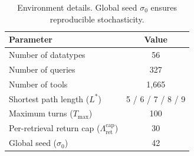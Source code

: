 \begin{table}[t]
\begin{center}
\small
\begin{tabular}{lc}
\toprule
\textbf{Parameter} & \textbf{Value} \\
\midrule
Number of datatypes & 56 \\
Number of queries & 327 \\
Number of tools & 1,665 \\
Shortest path length ($L^*$) & 5 / 6 / 7 / 8 / 9 \\
Maximum turns ($T_{\max}$) & 100 \\
Per-retrieval return cap ($\Lambda_{\mathrm{ret}}^{\mathrm{cap}}$) & 30  \\
Global seed ($\sigma_0$) & 42 \\
\bottomrule
\end{tabular}
\end{center}
\vspace{-0.13in}
\caption{Environment details. Global seed $\sigma_0$ ensures reproducible stochasticity.}
\label{tab:default_env_settings}
\vspace{-0.25in}
\end{table}